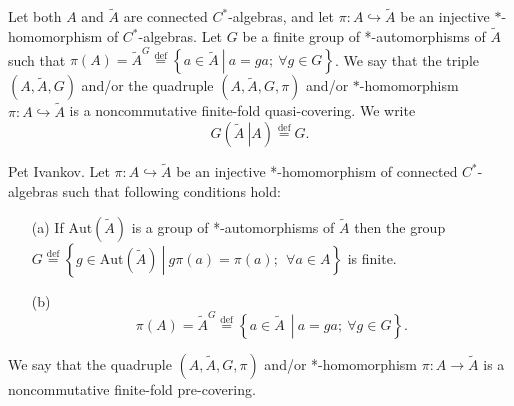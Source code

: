 \documentclass{beamer}
\theoremstyle{plain}
\newcommand{\be}{\begin{equation}}
\newcommand{\ee}{\end{equation}}
\newcommand{\Aut}{\mathrm{Aut}}
\newcommand{\bydef}{\stackrel{\mathrm{def}}{=}}
\newcommand{\hookto}{\hookrightarrow}        %
\begin{document}
\begin{frame}
   \begin{definition}\label{fin_quasi_defn}
	Let both  $A$ and  $\widetilde{A}$ are connected $C^*$-algebras, and let $\pi: A \hookto \widetilde{A}$ be an injective $*$-homomorphism of %
	$C^*$-algebras. Let $G$ be a finite  group of *-automorphisms of $\widetilde{A}$ such that 	$\pi\left(A\right) = \widetilde{A}^G\stackrel{\text{def}}{=}\left\{
	\left.a\in \widetilde{A}~\right|~ a = g a;~ \forall g \in G\right\}$.	We say that the triple $\left(A, \widetilde{A}, G \right)$ and/or the quadruple $\left(A, \widetilde{A}, G, \pi \right)$ and/or $*$-homomorphism $\pi: A \hookto \widetilde{A}$   is a \alert{noncommutative finite-fold  quasi-covering}. We write
	\be\label{fin_cov_gr_eqn}
	G\left(\left.\widetilde{A}~\right| {A} \right) \stackrel{\text{def}}{=}  	G.
	\ee
\end{definition}
\end{frame}
\begin{frame}
	\begin{definition}\label{pre_defn} \alert{Pet Ivankov}.
		Let $\pi: A \hookto \widetilde{A}$ be an injective *-homomorphism of connected  $C^*$-algebras such that following conditions hold:
		\begin{enumerate}
			\item[(a)] If $\Aut\left(\widetilde{A} \right)$ is a group of *-automorphisms of $\widetilde{A}$ then the group  
			$
			G \bydef \left\{ \left.g \in \Aut\left(\widetilde{A} \right)~\right|~ g\pi\left( a\right)  = \pi\left( a\right) ;~~\forall a \in A\right\}
			$
			is finite.
			\item[(b)] 	\be\label{cond_b_eqn}
			\pi\left( 	A\right)  = \widetilde{A}^G\stackrel{\text{def}}{=}\left\{\left.a\in \widetilde{A}~~\right|~ a = g a;~ \forall g \in G\right\}.\ee
		\end{enumerate}
		We say that the quadruple $\left(A, \widetilde{A}, G, \pi \right)$ and/or *-homomorphism $\pi: A \to \widetilde{A}$   is a \alert{noncommutative finite-fold  pre-covering}. 
	\end{definition}
	
\end{frame}
\end{document}
